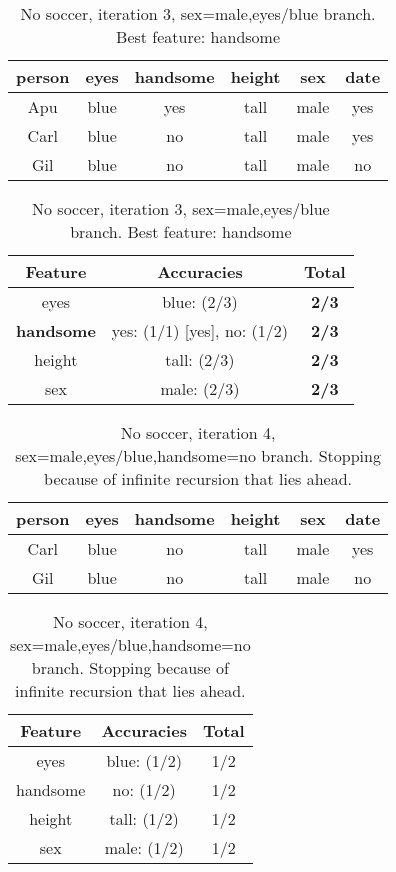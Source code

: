 \begin{table}[h!]
  \centering
  \begin{tabular}{ccccc|c}
    \toprule
    person      & eyes  & handsome & height & sex    & date\\
    \midrule
    Apu         & blue  & yes      & tall   & male   & yes \\
    Carl        & blue  & no       & tall   & male   & yes \\
    Gil         & blue  & no       & tall   & male   & no  \\
    \bottomrule
  \end{tabular}

  \vspace{.5cm}

  \begin{tabular}{ccc}
    \toprule
    Feature           & Accuracies                  & Total\\
    \midrule
    eyes              & blue: (2/3)                 & \textbf{2/3}\\
    \textbf{handsome} & yes: (1/1) [yes], no: (1/2) & \textbf{2/3}\\
    height            & tall: (2/3)                 & \textbf{2/3}\\
    sex               & male: (2/3)                 & \textbf{2/3}\\
    \bottomrule
  \end{tabular}
  \caption*{No soccer, iteration 3, sex=male,eyes/blue branch. Best feature: handsome}
\end{table}

\begin{table}[h!]
  \centering
  \begin{tabular}{ccccc|c}
    \toprule
    person      & eyes  & handsome & height & sex    & date\\
    \midrule
    Carl        & blue  & no       & tall   & male   & yes \\
    Gil         & blue  & no       & tall   & male   & no  \\
    \bottomrule
  \end{tabular}

  \vspace{.5cm}

  \begin{tabular}{ccc}
    \toprule
    Feature           & Accuracies                  & Total\\
    \midrule
    eyes              & blue: (1/2)                 & 1/2\\
    handsome          & no: (1/2)                   & 1/2\\
    height            & tall: (1/2)                 & 1/2\\
    sex               & male: (1/2)                 & 1/2\\
    \bottomrule
  \end{tabular}
  \caption*{No soccer, iteration 4, sex=male,eyes/blue,handsome=no branch.
  Stopping because of infinite recursion that lies ahead.}
\end{table}

